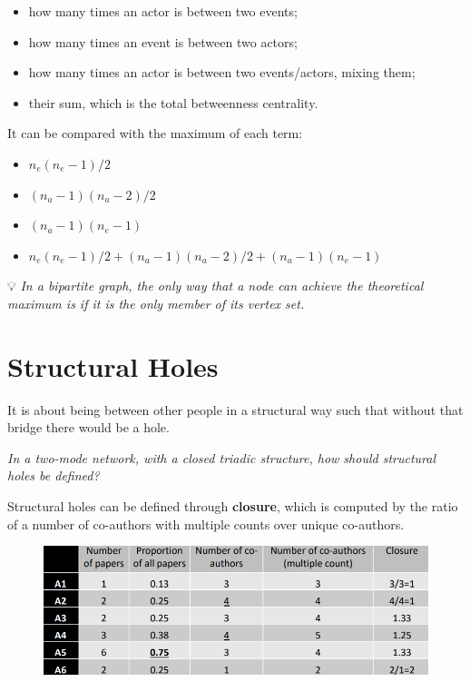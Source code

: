 \documentclass[
  notitlepage,
  onecolumn,
  openany]{book}
\providecommand{\tightlist}{%
  \setlength{\itemsep}{0pt}\setlength{\parskip}{0pt}}
\begin{document}
\begin{itemize}
\tightlist
\item
  how many times an actor is between two events;
\item
  how many times an event is between two actors;
\item
  how many times an actor is between two events/actors, mixing them;
\item
  their sum, which is the total betweenness centrality.
\end{itemize}

It can be compared with the maximum of each term:

\begin{itemize}
\tightlist
\item
  \(n_e(n_e-1)/2\)
\item
  \((n_a-1)(n_a-2)/2\)
\item
  \((n_a-1)(n_e-1)\)
\item
  \(n_e(n_e-1)/2+(n_a-1)(n_a-2)/2+(n_a-1)(n_e-1)\)
\end{itemize}

💡 \emph{In a bipartite graph, the only way that a node can achieve the theoretical maximum is if it is the only member of its vertex set.}

\hypertarget{structural-holes}{%
\section{Structural Holes}\label{structural-holes}}

It is about being between other people in a structural way such that without that bridge there would be a hole.

\emph{In a two-mode network, with a closed triadic structure, how should structural holes be defined?}

Structural holes can be defined through \textbf{closure}, which is computed by the ratio of a number of co-authors with multiple counts over unique co-authors.

\begin{figure}[h!]

{\centering \includegraphics[width=0.8\linewidth]{images/10-Two mode networks/Untitled 10} 

}

\end{figure}
\end{document}
